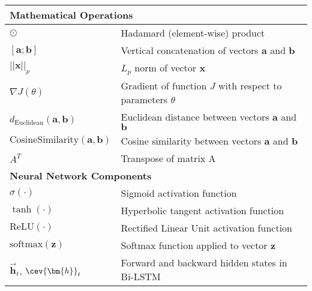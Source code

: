 \begin{appendices}
\begin{table}[htbp]
{\begin{tabular}{p{}p{}}
        \midrule
        \multicolumn{2}{l}{\textbf{Mathematical Operations}}                                                                                  \\
        \midrule
        $\odot$                                        & Hadamard (element-wise) product                                                      \\
        $[\bm{a};\bm{b}]$                              & Vertical concatenation of vectors $\bm{a}$ and $\bm{b}$                              \\
        $||\bm{x}||_p$                                 & $L_p$ norm of vector $\bm{x}$                                                        \\
        $\nabla J(\theta)$                             & Gradient of function $J$ with respect to parameters $\theta$                         \\
        $d_{\text{Euclidean}}(\bm{a},\bm{b})$          & Euclidean distance between vectors $\bm{a}$ and $\bm{b}$                             \\
        $\text{CosineSimilarity}(\bm{a},\bm{b})$       & Cosine similarity between vectors $\bm{a}$ and $\bm{b}$                              \\
        $A^T$                                          & Transpose of matrix A                                                                \\
        \midrule
        \multicolumn{2}{l}{\textbf{Neural Network Components}}                                                                                \\
        \midrule
        $\sigma(\cdot)$                                & Sigmoid activation function                                                          \\
        $\tanh(\cdot)$                                 & Hyperbolic tangent activation function                                               \\
        $\text{ReLU}(\cdot)$                           & Rectified Linear Unit activation function                                            \\
        $\text{softmax}(\bm{z})$                       & Softmax function applied to vector $\bm{z}$                                          \\
        $\vec{\bm{h}}_t$, $\cev{\bm{h}}_t$             & Forward and backward hidden states in Bi-LSTM                                        \\

\end{tabular}}
\end{table}
\end{appendices}
